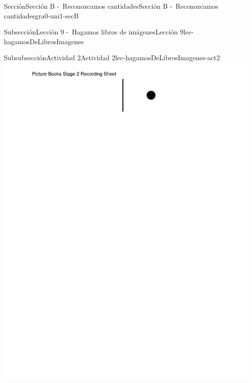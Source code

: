 \begin{sectionptx}{Sección}{Sección B -~Reconozcamos cantidades}{}{Sección B -~Reconozcamos cantidades}{}{}{gra0-uni1-secB}
\begin{subsectionptx}{Subsección}{Lección 9 -~Hagamos libros de imágenes}{}{Lección 9}{}{}{lec-hagamosDeLibrosImagenes}
\begin{subsubsectionptx}{Subsubsección}{Actividad 2}{}{Actividad 2}{}{}{lec-hagamosDeLibrosImagenes-act2}
\includegraphics[page=1, rotate=90, trim=90 35 35 35, clip, width=\linewidth, center]{external/blm/pdf-source/center-picture-books-k-5-stage-2-create-picture-books-stage-2-recording-sheet.pdf}
\clearpage

\end{subsubsectionptx}
\end{subsectionptx}
\end{sectionptx}

